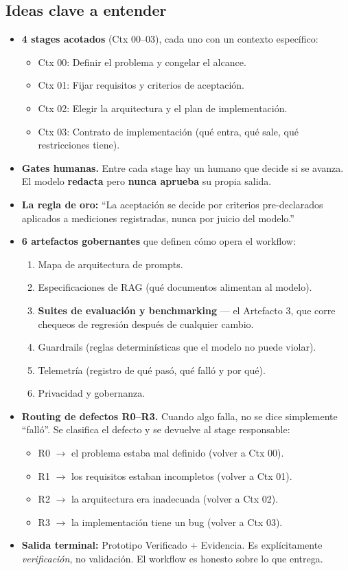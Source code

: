 \documentclass[11pt,a4paper]{article}
\begin{document}
\subsection{Ideas clave a entender}
\begin{itemize}
  \item \textbf{4 stages acotados} (Ctx 00--03), cada uno con un contexto espec\'ifico:
    \begin{itemize}
      \item Ctx 00: Definir el problema y congelar el alcance.
      \item Ctx 01: Fijar requisitos y criterios de aceptaci\'on.
      \item Ctx 02: Elegir la arquitectura y el plan de implementaci\'on.
      \item Ctx 03: Contrato de implementaci\'on (qu\'e entra, qu\'e sale, qu\'e restricciones tiene).
    \end{itemize}
  \item \textbf{Gates humanas.} Entre cada stage hay un humano que decide si se avanza. El modelo \textbf{redacta} pero \textbf{nunca aprueba} su propia salida.
  \item \textbf{La regla de oro:} ``La aceptaci\'on se decide por criterios pre-declarados aplicados a mediciones registradas, nunca por juicio del modelo.''
  \item \textbf{6 artefactos gobernantes} que definen c\'omo opera el workflow:
    \begin{enumerate}
      \item Mapa de arquitectura de prompts.
      \item Especificaciones de RAG (qu\'e documentos alimentan al modelo).
      \item \textbf{Suites de evaluaci\'on y benchmarking} --- el Artefacto 3, que corre chequeos de regresi\'on despu\'es de cualquier cambio.
      \item Guardrails (reglas determin\'isticas que el modelo no puede violar).
      \item Telemetr\'ia (registro de qu\'e pas\'o, qu\'e fall\'o y por qu\'e).
      \item Privacidad y gobernanza.
    \end{enumerate}
  \item \textbf{Routing de defectos R0--R3.} Cuando algo falla, no se dice simplemente ``fall\'o''. Se clasifica el defecto y se devuelve al stage responsable:
    \begin{itemize}
      \item R0 $\to$ el problema estaba mal definido (volver a Ctx 00).
      \item R1 $\to$ los requisitos estaban incompletos (volver a Ctx 01).
      \item R2 $\to$ la arquitectura era inadecuada (volver a Ctx 02).
      \item R3 $\to$ la implementaci\'on tiene un bug (volver a Ctx 03).
    \end{itemize}
  \item \textbf{Salida terminal:} Prototipo Verificado + Evidencia. Es expl\'icitamente \textit{verificaci\'on}, no validaci\'on. El workflow es honesto sobre lo que entrega.
\end{itemize}
\end{document}
